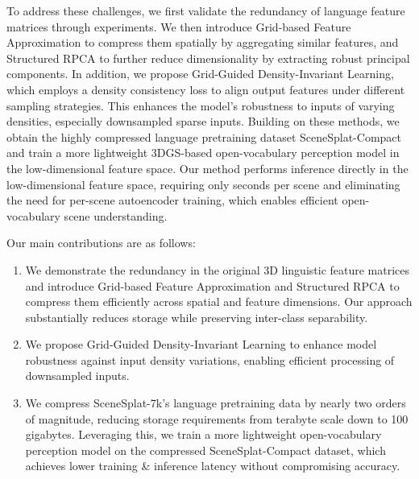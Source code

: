 \documentclass[runningheads]{llncs}
\begin{document}
To address these challenges, we first validate the redundancy of language feature matrices through experiments. We then introduce Grid-based Feature Approximation to compress them spatially by aggregating similar features, and Structured RPCA to further reduce dimensionality by extracting robust principal components.
In addition, we propose Grid-Guided Density-Invariant Learning, which employs a density consistency loss to align output features under different sampling strategies. This enhances the model’s robustness to inputs of varying densities, especially downsampled sparse inputs.
Building on these methods, we obtain the highly compressed language pretraining dataset SceneSplat-Compact and train a more lightweight 3DGS-based open-vocabulary perception model in the low-dimensional feature space.
Our method performs inference directly in the low-dimensional feature space, requiring only seconds per scene and eliminating the need for per-scene autoencoder training, which enables efficient open-vocabulary scene understanding.

Our main contributions are as follows:
\begin{enumerate}
    \item We demonstrate the redundancy in the original 3D linguistic feature matrices and introduce Grid-based Feature Approximation and Structured RPCA to compress them efficiently across spatial and feature dimensions. Our approach substantially reduces storage while preserving inter-class separability.
    \item We propose Grid-Guided Density-Invariant Learning to enhance model robustness against input density variations, enabling efficient processing of downsampled inputs.
    \item We compress SceneSplat-7k's language pretraining data by nearly two orders of magnitude, reducing storage requirements from terabyte scale down to 100 gigabytes. Leveraging this, we train a more lightweight open-vocabulary perception model on the compressed SceneSplat-Compact dataset, which achieves lower training \& inference latency without compromising accuracy.
\end{enumerate}
\end{document}

